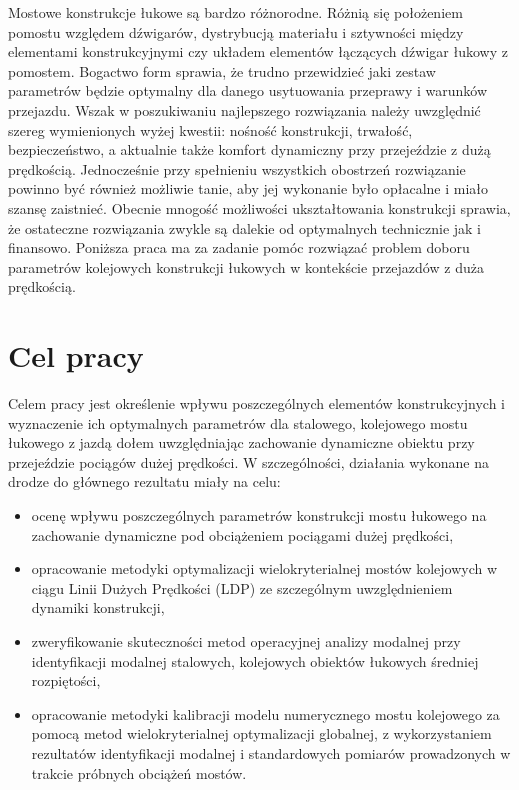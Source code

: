 Mostowe konstrukcje łukowe są bardzo różnorodne. Różnią się położeniem pomostu względem dźwigarów, dystrybucją materiału i sztywności między elementami konstrukcyjnymi czy układem elementów łączących dźwigar łukowy z pomostem. Bogactwo form sprawia, że trudno przewidzieć jaki zestaw parametrów będzie optymalny dla danego usytuowania przeprawy i warunków przejazdu. Wszak w poszukiwaniu najlepszego rozwiązania należy uwzględnić szereg wymienionych wyżej kwestii: nośność konstrukcji, trwałość, bezpieczeństwo, a aktualnie także komfort dynamiczny przy przejeździe z dużą prędkością. Jednocześnie przy spełnieniu wszystkich obostrzeń rozwiązanie powinno być również możliwie tanie, aby jej wykonanie było opłacalne i miało szansę zaistnieć. Obecnie mnogość możliwości ukształtowania konstrukcji sprawia, że ostateczne rozwiązania zwykle są dalekie od optymalnych technicznie jak i finansowo. Poniższa praca ma za zadanie pomóc rozwiązać problem doboru parametrów kolejowych konstrukcji łukowych w kontekście przejazdów z duża prędkością. 


\section*{Cel pracy}
Celem pracy jest określenie wpływu poszczególnych elementów konstrukcyjnych i wyznaczenie ich optymalnych parametrów dla stalowego, kolejowego mostu łukowego z jazdą dołem uwzględniając zachowanie dynamiczne obiektu przy przejeździe pociągów dużej prędkości.
W szczególności, działania wykonane na drodze do głównego rezultatu miały na celu:
\begin{itemize}
	\item ocenę wpływu poszczególnych parametrów konstrukcji mostu łukowego na zachowanie dynamiczne pod obciążeniem pociągami dużej prędkości,
	\item opracowanie metodyki optymalizacji wielokryterialnej mostów kolejowych w ciągu Linii Dużych Prędkości (LDP) ze szczególnym uwzględnieniem dynamiki konstrukcji,
	\item zweryfikowanie skuteczności metod operacyjnej analizy modalnej przy identyfikacji modalnej stalowych, kolejowych obiektów łukowych średniej rozpiętości,
	\item opracowanie metodyki kalibracji modelu numerycznego mostu kolejowego za pomocą metod wielokryterialnej optymalizacji globalnej, z wykorzystaniem rezultatów identyfikacji modalnej i standardowych pomiarów prowadzonych w trakcie próbnych obciążeń mostów.


\end{itemize}


